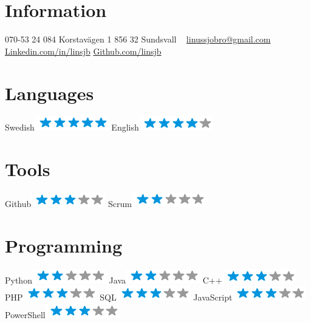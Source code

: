 \begin{aside}
    \section{Information}
      070-53 24 084
      Korstavägen 1
      856 32 Sundsvall
      ~
      \href{mailto:linussjobro@gmail.com}{linussjobro@gmail.com}
      \href{https://www.linkedin.com/in/linsjb}{Linkedin.com/in/linsjb}
      \href{https://github.com/linsjb}{Github.com/linsjb}
    \section{Languages}
      Swedish\includegraphics[scale=0.40]{img/5stars.png}
      English\includegraphics[scale=0.40]{img/4stars.png}
    \section{Tools}
      Github\includegraphics[scale=0.40]{img/3stars.png}
      Scrum\includegraphics[scale=0.40]{img/2stars.png}
    \section{Programming}
      Python\includegraphics[scale=0.40]{img/2stars.png}
      Java\includegraphics[scale=0.40]{img/2stars.png}
      C++\includegraphics[scale=0.40]{img/3stars.png}
      PHP\includegraphics[scale=0.40]{img/3stars.png}
      SQL\includegraphics[scale=0.40]{img/3stars.png}
      JavaScript\includegraphics[scale=0.40]{img/3stars.png}
      PowerShell\includegraphics[scale=0.40]{img/3stars.png}

\end{aside}
